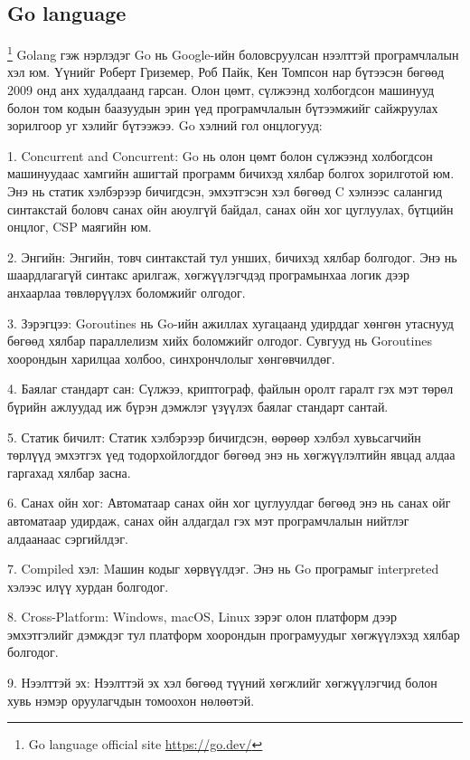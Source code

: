 \subsection{Go language}
	\footnote{Go language official site \url{https://go.dev/}}
		\quad \quad Golang гэж нэрлэдэг Go нь Google-ийн боловсруулсан нээлттэй програмчлалын хэл юм. Үүнийг Роберт Гриземер, Роб Пайк, Кен Томпсон нар бүтээсэн бөгөөд 2009 онд анх худалдаанд гарсан. Олон цөмт, сүлжээнд холбогдсон машинууд болон том кодын баазуудын эрин үед програмчлалын бүтээмжийг сайжруулах зорилгоор уг хэлийг бүтээжээ. Go хэлний гол онцлогууд:

		1. Concurrent and Concurrent: Go нь олон цөмт болон сүлжээнд холбогдсон машинуудаас хамгийн ашигтай программ бичихэд хялбар болгох зорилготой юм. Энэ нь статик хэлбэрээр бичигдсэн, эмхэтгэсэн хэл бөгөөд C хэлнээс салангид синтакстай боловч санах ойн аюулгүй байдал, санах ойн хог цуглуулах, бүтцийн онцлог, CSP маягийн юм.
		
		2. Энгийн: Энгийн, товч синтакстай тул унших, бичихэд хялбар болгодог. Энэ нь шаардлагагүй синтакс арилгаж, хөгжүүлэгчдэд програмынхаа логик дээр анхаарлаа төвлөрүүлэх боломжийг олгодог.
		
		3. Зэрэгцээ: Goroutines нь Go-ийн ажиллах хугацаанд удирддаг хөнгөн утаснууд бөгөөд хялбар параллелизм хийх боломжийг олгодог. Сувгууд нь Goroutines хоорондын харилцаа холбоо, синхрончлолыг хөнгөвчилдөг.
		
		4. Баялаг стандарт сан: Сүлжээ, криптограф, файлын оролт гаралт гэх мэт төрөл бүрийн ажлуудад иж бүрэн дэмжлэг үзүүлэх баялаг стандарт сантай.
		
		5. Статик бичилт: Статик хэлбэрээр бичигдсэн, өөрөөр хэлбэл хувьсагчийн төрлүүд эмхэтгэх үед тодорхойлогддог бөгөөд энэ нь хөгжүүлэлтийн явцад алдаа гаргахад хялбар засна.
		
		6. Санах ойн хог: Автоматаар санах ойн хог цуглуулдаг бөгөөд энэ нь санах ойг автоматаар удирдаж, санах ойн алдагдал гэх мэт програмчлалын нийтлэг алдаанаас сэргийлдэг.
		
		7. Compiled хэл: Mашин кодыг хөрвүүлдэг. Энэ нь Go програмыг interpreted хэлээс илүү хурдан болгодог.
		
		8. Cross-Platform: Windows, macOS, Linux зэрэг олон платформ дээр эмхэтгэлийг дэмждэг тул платформ хоорондын програмуудыг хөгжүүлэхэд хялбар болгодог.
		
		9. Нээлттэй эх: Нээлттэй эх хэл бөгөөд түүний хөгжлийг хөгжүүлэгчид болон хувь нэмэр оруулагчдын томоохон нөлөөтэй.
		
